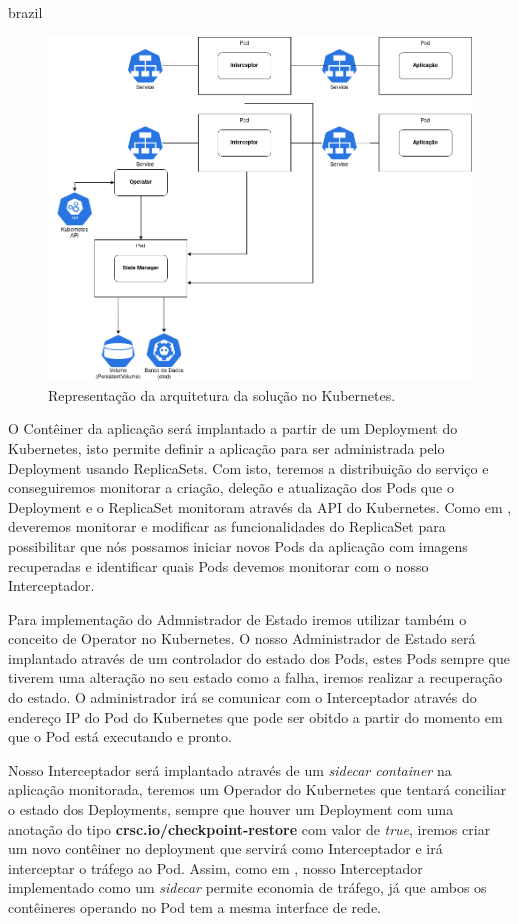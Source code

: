 \begin{otherlanguage*}{brazil}
\begin{figure}[h]
\centering
\includegraphics[scale=0.46]{images/kubernetes-architecture.png}
\caption{Representação da arquitetura da solução no Kubernetes.}
\label{fig:kubernetes-architecture}
\end{figure}

O Contêiner da aplicação será implantado a partir de um Deployment do Kubernetes, isto
permite definir a aplicação para ser administrada pelo Deployment usando ReplicaSets.
Com isto, teremos a distribuição do serviço e conseguiremos monitorar a criação, deleção
e atualização dos Pods que o Deployment e o ReplicaSet monitoram através da API do
Kubernetes. Como em \cite{schmidt2023state}, deveremos monitorar e modificar as
funcionalidades do ReplicaSet para possibilitar que nós possamos iniciar novos Pods
da aplicação com imagens recuperadas e identificar quais Pods devemos monitorar com
o nosso Interceptador.

Para implementação do Admnistrador de Estado iremos utilizar também o conceito de Operator
no Kubernetes. O nosso Administrador de Estado será implantado através de um controlador do
estado dos Pods, estes Pods sempre que tiverem uma alteração no seu estado como a falha, iremos
realizar a recuperação do estado. O administrador irá se comunicar com o Interceptador através
do endereço IP do Pod do Kubernetes que pode ser obitdo a partir do momento em que o Pod está
executando e pronto.

Nosso Interceptador será implantado através de um \textit{sidecar container} na aplicação
monitorada, teremos um Operador do Kubernetes que tentará conciliar o estado dos Deployments,
sempre que houver um Deployment com uma anotação do tipo \textbf{crsc.io/checkpoint-restore}
com valor de \textit{true}, iremos criar um novo contêiner no deployment que servirá como 
Interceptador e irá interceptar o tráfego ao Pod. Assim, como em \cite{muller2022architecture},
nosso Interceptador implementado como um \textit{sidecar} permite economia de tráfego, já que
ambos os contêineres operando no Pod tem a mesma interface de rede.


\end{otherlanguage*}
